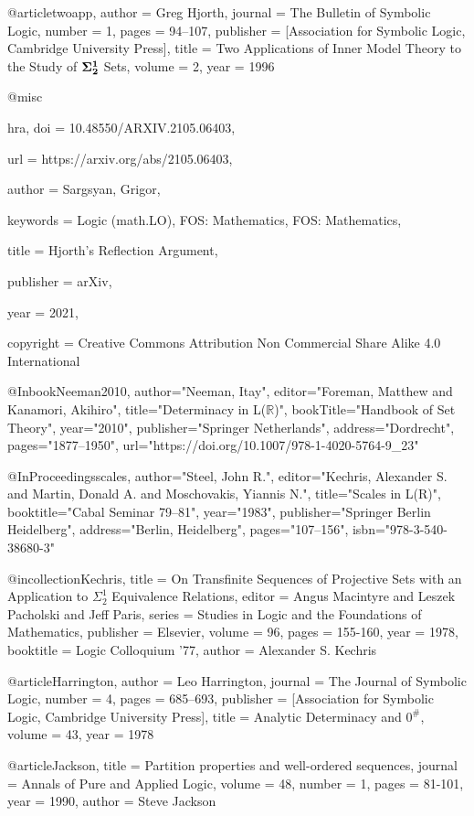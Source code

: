 @article{twoapp,
 author = {Greg Hjorth},
 journal = {The Bulletin of Symbolic Logic},
 number = {1},
 pages = {94--107},
 publisher = {[Association for Symbolic Logic, Cambridge University Press]},
 title = {Two Applications of Inner Model Theory to the Study of $\bf{\Sigma^1_2}$ Sets},
 volume = {2},
 year = {1996}
}

@misc{hra,
  doi = {10.48550/ARXIV.2105.06403},
  
  url = {https://arxiv.org/abs/2105.06403},
  
  author = {Sargsyan, Grigor},
  
  keywords = {Logic (math.LO), FOS: Mathematics, FOS: Mathematics},
  
  title = {Hjorth's Reflection Argument},
  
  publisher = {arXiv},
  
  year = {2021},
  
  copyright = {Creative Commons Attribution Non Commercial Share Alike 4.0 International}
}

@Inbook{Neeman2010,
author="Neeman, Itay",
editor="Foreman, Matthew
and Kanamori, Akihiro",
title="Determinacy in L($\mathbb{R}$)",
bookTitle="Handbook of Set Theory",
year="2010",
publisher="Springer Netherlands",
address="Dordrecht",
pages="1877--1950",
url="https://doi.org/10.1007/978-1-4020-5764-9_23"
}

@InProceedings{scales,
author="Steel, John R.",
editor="Kechris, Alexander S.
and Martin, Donald A.
and Moschovakis, Yiannis N.",
title="Scales in L(R)",
booktitle="Cabal Seminar 79--81",
year="1983",
publisher="Springer Berlin Heidelberg",
address="Berlin, Heidelberg",
pages="107--156",
isbn="978-3-540-38680-3"
}

@incollection{Kechris,
title = {On Transfinite Sequences of Projective Sets with an Application to $\Sigma^1_2$ Equivalence Relations},
editor = {Angus Macintyre and Leszek Pacholski and Jeff Paris},
series = {Studies in Logic and the Foundations of Mathematics},
publisher = {Elsevier},
volume = {96},
pages = {155-160},
year = {1978},
booktitle = {Logic Colloquium '77},
author = {Alexander S. Kechris}
}

@article{Harrington,
 author = {Leo Harrington},
 journal = {The Journal of Symbolic Logic},
 number = {4},
 pages = {685--693},
 publisher = {[Association for Symbolic Logic, Cambridge University Press]},
 title = {Analytic Determinacy and $0^\#$},
 volume = {43},
 year = {1978}
}

@article{Jackson,
title = {Partition properties and well-ordered sequences},
journal = {Annals of Pure and Applied Logic},
volume = {48},
number = {1},
pages = {81-101},
year = {1990},
author = {Steve Jackson}
}

